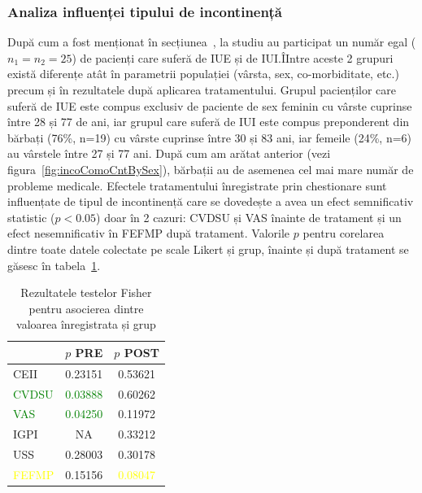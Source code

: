 \documentclass[12pt,draft]{article}
\begin{document}
\subsubsection{Analiza influenței tipului de incontinență}
 După cum a fost menționat în secțiunea~, la studiu au participat un număr egal ($n_1=n_2=25$) de pacienți care suferă de \ac{IUE} și de \ac{IUI}.ÎIntre aceste 2 grupuri există diferențe atât în parametrii populației (vârsta, sex, co-morbiditate, etc.) precum și în rezultatele după aplicarea tratamentului. Grupul pacienților care suferă de \ac{IUE} este compus exclusiv de paciente de sex feminin cu vârste cuprinse între 28 și 77 de ani, iar grupul care suferă de \ac{IUI} este compus preponderent din bărbați (76\%, n=19) cu vârste cuprinse între 30 și 83 ani, iar femeile (24\%, n=6) au vârstele între 27 și 77 ani. După cum am arătat anterior (vezi figura~\ref{fig:incoComoCntBySex}), bărbații au de asemenea cel mai mare număr de probleme medicale.
Efectele tratamentului înregistrate prin chestionare sunt influențate de tipul de incontinență care se dovedește a avea un efect semnificativ statistic ($p<0.05$) doar în 2 cazuri: \ac{CVDSU} și \ac{VAS} înainte de tratament și un efect nesemnificativ în \ac{FEFMP} după tratament. Valorile $p$ pentru corelarea dintre toate datele colectate pe scale Likert și grup, înainte și după tratament se găsesc în tabela~\ref{tab:resFisherGroup}. 
 \begin{table}[H]
	\centering
	\begin{tabular}{|l|c|c|} \hline
	   																	& $p$ PRE 													& $p$ POST \\ \hline
		CEII 														& 0.23151 													& 0.53621 \\ \hline
		\textcolor{green}{CVDSU} 	& \textcolor{green}{0.03888} 	& 0.60262 \\ \hline
		\textcolor{green}{VAS} 			& \textcolor{green}{0.04250} 	& 0.11972 \\ \hline
		IGPI 														& NA 																&  0.33212 \\ \hline
		USS 															& 0.28003 													& 0.30178 \\ \hline
		\textcolor{yellow}{FEFMP} 	& 0.15156 													& \textcolor{yellow}{0.08047} \\ \hline
	\end{tabular}
	\caption{Rezultatele testelor Fisher pentru asocierea dintre valoarea înregistrata și grup} 
	\label{tab:resFisherGroup}
\end{table}
%
\end{document}
